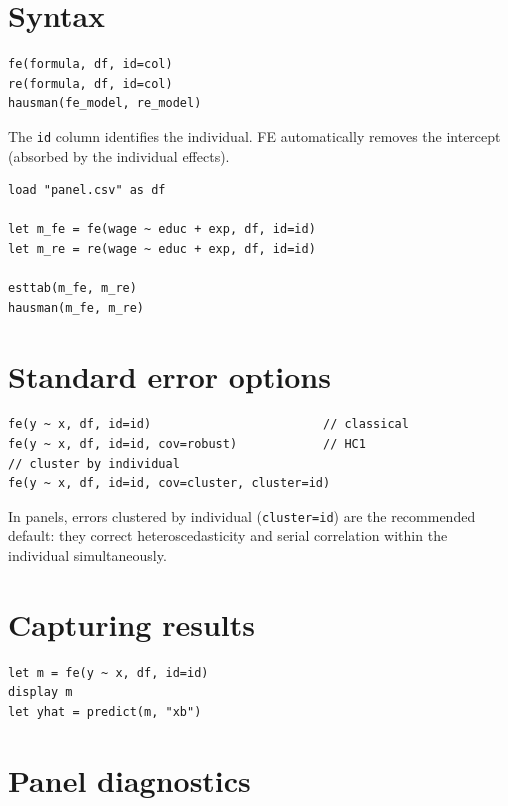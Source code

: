 \section{Syntax}

\begin{lstlisting}
fe(formula, df, id=col)
re(formula, df, id=col)
hausman(fe_model, re_model)
\end{lstlisting}

The \lstinline{id} column identifies the individual. FE automatically removes
the intercept (absorbed by the individual effects).

\begin{lstlisting}[caption={Complete workflow}]
load "panel.csv" as df

let m_fe = fe(wage ~ educ + exp, df, id=id)
let m_re = re(wage ~ educ + exp, df, id=id)

esttab(m_fe, m_re)
hausman(m_fe, m_re)
\end{lstlisting}

\section{Standard error options}

\begin{lstlisting}
fe(y ~ x, df, id=id)                        // classical
fe(y ~ x, df, id=id, cov=robust)            // HC1
// cluster by individual
fe(y ~ x, df, id=id, cov=cluster, cluster=id)
\end{lstlisting}

\begin{nota}
  In panels, errors clustered by individual (\lstinline{cluster=id})
  are the recommended default: they correct heteroscedasticity and serial
  correlation within the individual simultaneously.
\end{nota}

\section{Capturing results}

\begin{lstlisting}
let m = fe(y ~ x, df, id=id)
display m
let yhat = predict(m, "xb")
\end{lstlisting}

\section{Panel diagnostics}


